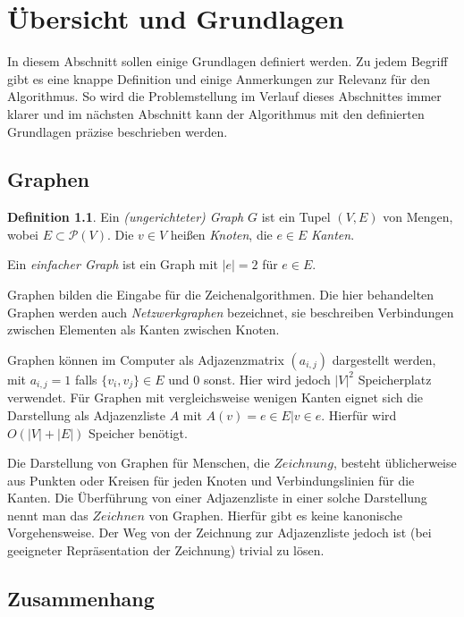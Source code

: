\documentclass[a4paper]{scrreprt}
\theoremstyle{definition}
\newtheorem{definition}[satz]{Definition}
\begin{document}
\chapter{Übersicht und Grundlagen}

In diesem Abschnitt sollen einige Grundlagen definiert werden. Zu jedem Begriff gibt es eine knappe Definition und einige Anmerkungen zur Relevanz für den Algorithmus. So wird die Problemstellung im Verlauf dieses Abschnittes immer klarer und im nächsten Abschnitt kann der Algorithmus mit den definierten Grundlagen präzise beschrieben werden.

\section{Graphen}

\begin{definition}
  Ein \emph{(ungerichteter) Graph} $G$ ist ein Tupel $(V, E)$ von Mengen, wobei $E \subset \mathcal{P}(V)$.
  Die $v \in V$ heißen \emph{Knoten}, die $e \in E$ \emph{Kanten}.

  Ein \emph{einfacher Graph} ist ein Graph mit $|e| = 2$ für $e \in E$.
\end{definition}

Graphen bilden die Eingabe für die Zeichenalgorithmen. Die hier behandelten Graphen werden auch \emph{Netzwerkgraphen} bezeichnet, sie beschreiben Verbindungen zwischen Elementen als Kanten zwischen Knoten. 

Graphen können im Computer als Adjazenzmatrix $(a_{i,j})$ dargestellt werden, mit $a_{i,j} = 1$ falls $\{v_i, v_j\} \in E$ und $0$ sonst. Hier wird jedoch $|V|^2$ Speicherplatz verwendet. Für Graphen mit vergleichsweise wenigen Kanten eignet sich die Darstellung als Adjazenzliste $A$ mit $A(v) = {e \in E | v \in e}$. Hierfür wird $O(|V| + |E|)$ Speicher benötigt. %

Die Darstellung von Graphen für Menschen, die $Zeichnung$, besteht üblicherweise aus Punkten oder Kreisen für jeden Knoten und Verbindungslinien für die Kanten. Die Überführung von einer Adjazenzliste in einer solche Darstellung nennt man das $Zeichnen$ von Graphen. Hierfür gibt es keine kanonische Vorgehensweise. Der Weg von der Zeichnung zur Adjazenzliste jedoch ist (bei geeigneter Repräsentation der Zeichnung) trivial zu lösen.

\section{Zusammenhang}
\end{document}
